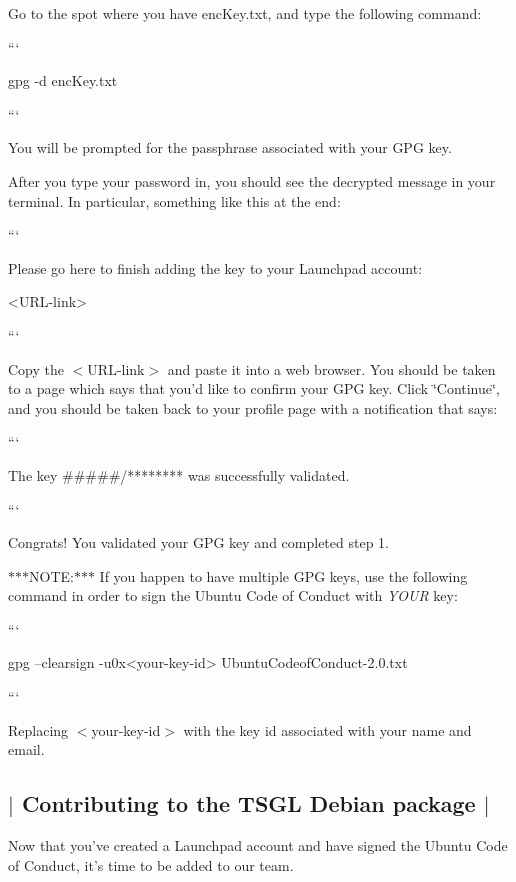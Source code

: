 Go to the spot where you have {\ttfamily enc\-Key.\-txt}, and type the following command\-:

``` \begin{DoxyVerb}gpg -d encKey.txt
\end{DoxyVerb}


```

You will be prompted for the passphrase associated with your G\-P\-G key.

After you type your password in, you should see the decrypted message in your terminal. In particular, something like this at the end\-:

``` \begin{DoxyVerb}Please go here to finish adding the key to your Launchpad account:

<URL-link>
\end{DoxyVerb}


```

Copy the $<$U\-R\-L-\/link$>$ and paste it into a web browser. You should be taken to a page which says that you'd like to confirm your G\-P\-G key. Click \char`\"{}\-Continue\char`\"{}, and you should be taken back to your profile page with a notification that says\-:

``` \begin{DoxyVerb}The key #####/******** was successfully validated.
\end{DoxyVerb}


```

Congrats! You validated your G\-P\-G key and completed step 1.

$\ast$$\ast$$\ast$\-N\-O\-T\-E\-:$\ast$$\ast$$\ast$ If you happen to have multiple G\-P\-G keys, use the following command in order to sign the Ubuntu Code of Conduct with {\itshape Y\-O\-U\-R} key\-:

``` \begin{DoxyVerb}gpg --clearsign -u0x<your-key-id> UbuntuCodeofConduct-2.0.txt 
\end{DoxyVerb}


```

Replacing {\ttfamily $<$your-\/key-\/id$>$} with the key id associated with your name and email. 

 \subsection*{$\vert$ Contributing to the T\-S\-G\-L Debian package $\vert$ }

Now that you've created a Launchpad account and have signed the Ubuntu Code of Conduct, it's time to be added to our team.

